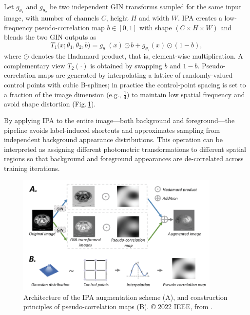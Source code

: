 Let $g_{\theta_1}$ and $g_{\theta_2}$ be two independent GIN transforms sampled for the same input image, with number of channels $C$, height $H$ and width $W$. IPA creates a low-frequency pseudo-correlation map $b\in[0,1]$ with shape $(C \times H \times W)$ and blends the two GIN outputs as
\begin{equation}\label{eq:ipa}
    T_1\bigl(x;\theta_1,\theta_2,b\bigr) = g_{\theta_1}(x) \odot b + g_{\theta_2}(x) \odot (1-b),
\end{equation}
where $\odot$ denotes the Hadamard product, that is, element-wise multiplication. A complementary view $T_2(\cdot)$ is obtained by swapping $b$ and $1-b$. Pseudo-correlation maps are generated by interpolating a lattice of randomly-valued control points with cubic B-splines; in practice the control-point spacing is set to a fraction of the image dimension $\bigl(\textrm{e.g., }\frac{1}{4}\bigr)$ to maintain low spatial frequency and avoid shape distortion (Fig.\,\ref{fig:ipa_schema}).

By applying IPA to the entire image---both background and foreground---the pipeline avoids label-induced shortcuts and approximates sampling from independent background appearance distributions. This operation can be interpreted as assigning different photometric transformations to different spatial regions so that background and foreground appearances are de-correlated across training iterations.

\begin{figure}[htbp]
    \centering
    \includegraphics[width=0.9\textwidth]{figures/ipa_schema.png}
    \caption{Architecture of the IPA augmentation scheme (A), and construction principles of pseudo-correlation maps (B). © 2022 IEEE, from \cite{Ouyang2023}.}
    \label{fig:ipa_schema}
\end{figure}


